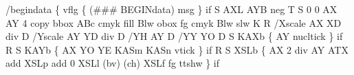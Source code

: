 \documentclass[11pt]{article}
\begin{document}
\nwenddocs{}\endmoddef
/begindata \{      %
  vflg \{ (### BEGINdata) msg \} if  %
  S               %
    AXL           %
    AYB neg       %
    T             %
    S             %
      0 0         %
      AX AY       %
      4 copy      %
      bbox        %
      ABc cmyk    %
      fill        %
      Blw obox    %
      fg cmyk     %
      Blw slw     %
      K           %
    R             %
    /Xscale       %
      AX XD div   %
    D             %
    /Yscale       %
      AY YD div   %
    D             %
    /YH           %
      AY          %
    D             %
    /YY           %
      YO          %
    D             %
    S             %
      KAXb \{      %
        AY nucltick  %
      \} if        %
    R             %
    S  %
      KAYb \{      %
        AX        %
        YO YE     %
        KASm KASn %
          vtick   %
      \} if        %
    R             %
    S             %
      XSLb \{      %
        AX 2 div  %
        AY        %
        ATX add   %
        XSLp add  %
        0         %
        XSLl      %
        (bv) (ch) %
        XSLf      %
        fg        %
        ttshw     %
      \} if        %
\end{document}
